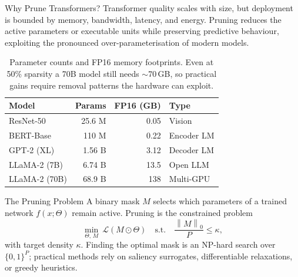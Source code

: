 \documentclass[final]{beamer}
\newlength{\onecolwid}
\newcommand{\norm}[1]{\left\lVert #1 \right\rVert}
\begin{document}
\begin{frame}[t]
\begin{columns}[t]
\begin{column}{\onecolwid}
\begin{block}{Why Prune Transformers?}
Transformer quality scales with size, but deployment is bounded by memory,
bandwidth, latency, and energy. Pruning reduces the active parameters or
executable units while preserving predictive behaviour, exploiting the
pronounced over-parameterisation of modern models.
\begin{table}
\renewcommand{\arraystretch}{1.2}
\small
\begin{tabularx}{\linewidth}{lrrX}
\toprule
\textbf{Model} & \textbf{Params} & \textbf{FP16 (GB)} & \textbf{Type} \\
\midrule
ResNet-50      & 25.6 M & 0.05 & Vision \\
BERT-Base      & 110 M  & 0.22 & Encoder LM \\
GPT-2 (XL)     & 1.56 B & 3.12 & Decoder LM \\
LLaMA-2 (7B)   & 6.74 B & 13.5 & Open LLM \\
LLaMA-2 (70B)  & 68.9 B & 138  & Multi-GPU \\
\bottomrule
\end{tabularx}
\caption{Parameter counts and FP16 memory footprints. Even at 50\% sparsity a
70B model still needs $\sim$70\,GB, so practical gains require removal patterns
the hardware can exploit.}
\end{table}
\end{block}

\begin{block}{The Pruning Problem}
A binary mask $M$ selects which parameters of a trained network
$f(x;\Theta)$ remain active. Pruning is the constrained problem
\[
\min_{\Theta,\,M}\ \mathcal{L}(M \odot \Theta)
\quad \text{s.t.} \quad
\frac{\norm{M}_0}{P} \le \kappa ,
\]
with target density $\kappa$. Finding the optimal mask is an NP-hard search
over $\{0,1\}^P$; practical methods rely on saliency surrogates,
differentiable relaxations, or greedy heuristics.
\end{block}


\end{column}
\end{columns}
\end{frame}
\end{document}
